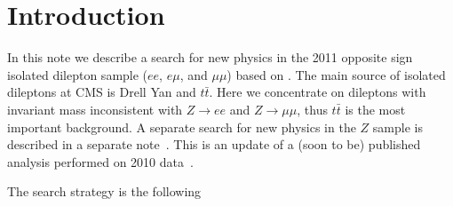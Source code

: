 \section{Introduction}
\label{sec:intro}

In this note we describe a search for new physics in the 2011 
opposite sign isolated dilepton sample ($ee$, $e\mu$, and $\mu\mu$)
based on \lumi.
The main source of 
isolated dileptons at CMS is Drell Yan and $t\bar{t}$.
Here we concentrate on dileptons with invariant mass inconsistent
with $Z \to ee$ and $Z \to \mu\mu$, thus $t\bar{t}$ is the most
important background.  A separate search for new physics in the $Z$ 
sample is described in a separate note~\cite{ref:Ztemplates}.
This is an update of a (soon to be) published analysis performed 
on 2010 data~\cite{ref:osnote,ref:ospaper}. 

The search strategy is the following

